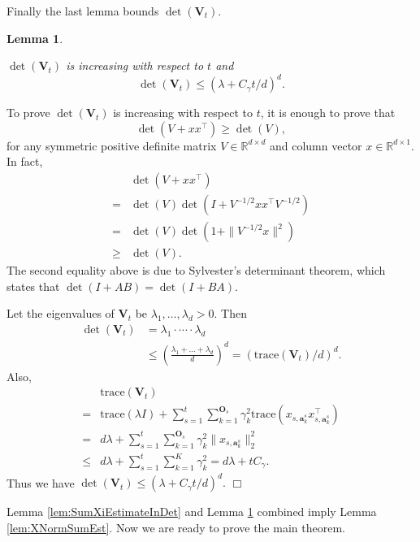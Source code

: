 \documentclass{article}
\newcommand{\RR}{\mathbb{R}}
\newcommand{\ba}{\mathbf{a}}
\newcommand{\bO}{\mathbf{O}}
\newcommand{\bV}{\mathbf{V}}
\newcommand{\trace}{\mathrm{trace}}
\newcommand{\norm}[1]{\| #1 \|}
\newtheorem{lemma}[theorem]{Lemma}%
\newenvironment{proof}{\noindent {\textbf{Proof. }}}{$\Box$ \medskip}
\newcommand{\CLemmaDetVt}{
  $\det(\bV_t)$ is increasing with respect to $t$ and 
  $$
    \det(\bV_t) \leq (\lambda + C_\gamma t/d)^d.
  $$
}
\begin{document}
Finally the last lemma bounds $\det(\bV_t)$.

\begin{lemma} %
	\label{lem:detVt}
	\CLemmaDetVt
\end{lemma}
\begin{proof}
	To prove $\det(\bV_t)$ is increasing with respect to $t$, it is enough to prove that
	$$
	\det(V + xx^{\top}) \geq \det(V),
	$$
	for any symmetric positive definite matrix $V \in \RR^{d \times d}$ and column vector $x \in \RR^{d\times 1}$. In fact,
	\begin{align*}
	&\det(V + xx^{\top}) \\
	=& \det(V) \det(I + V^{-1/2}x x^{\top} V^{-1/2})\\
	=& \det(V) \det(1 + \norm{V^{-1/2}x}^2)\\
	\geq &\det(V).
	\end{align*}
	The second equality above is due to Sylvester's determinant theorem, which states that $\det(I + AB) = \det(I +BA)$.
	
	Let the eigenvalues of $\bV_t$ be $\lambda_1, \ldots, \lambda_d > 0$. Then
	\begin{align*}
	\det(\bV_t) &= \lambda_1 \cdot \cdots \cdot \lambda_d \\
	&\leq  \left( \frac{\lambda_1 + \ldots + \lambda_d}{d} \right)^d = (\trace(\bV_t)/d)^d.
	\end{align*}
	Also,
	\begin{align*}
	&\trace(\bV_t)\\
	=& \trace(\lambda I) + \sum_{s=1}^t \sum_{k=1}^{\bO_s} \gamma_k^2 \trace(x_{s,\ba_k^s} x_{s,\ba_k^s}^{\top})\\	
	=& d \lambda + \sum_{s=1}^t \sum_{k=1}^{\bO_s} \gamma_k^2 \norm{x_{s,\ba_k^s}}_2^2\\
	\leq& d \lambda + \sum_{s=1}^t\sum_{k=1}^{K}\gamma_k^2 = d \lambda + t C_\gamma.
	\end{align*}
	Thus we have $\det(\bV_t) \leq (\lambda + C_\gamma t/d)^d.$
\end{proof}

Lemma \ref{lem:SumXiEstimateInDet} and Lemma \ref{lem:detVt} combined imply Lemma \ref{lem:XNormSumEst}. Now we are ready to prove the main theorem.
\end{document}
